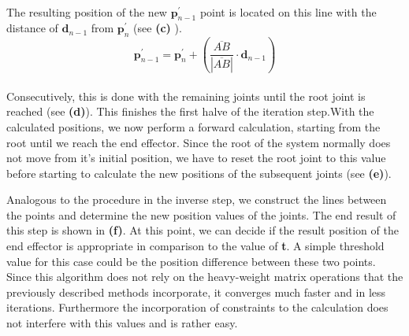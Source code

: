 \\The resulting position of the new $\textbf{p}_{n-1}^{'}$ point is located on this line with the distance of $\textbf{d}_{n-1}$ from $\textbf{p}_{n}^{'}$ (see \textbf{(c)} ).\\
\begin{equation}
\textbf{p}_{n-1}^{'}= \textbf{p}_{n}^{'}+ \left(\frac{\overline{AB}}{|\overline{AB}|}\cdot\textbf{d}_{n-1}\right)
\end{equation}
\\Consecutively, this is done with the remaining joints until the root joint is reached (see \textbf{(d)}).
This finishes the first halve of the iteration step.With the calculated positions, we now perform a forward calculation, starting from the root until we reach the end effector. Since the root of the system normally does not move from it's initial position, we have to reset the root joint to this value before starting to calculate the new positions of the subsequent joints (see\textbf{ (e)}).

Analogous to the procedure in the inverse step, we construct the lines between the points and determine the new position values of the joints. The end result of this step is shown in \textbf{(f)}. At this point, we can decide if the result position of the end effector is appropriate in comparison to the value of \textbf{t}. A simple threshold value for this case could be the position difference between these two points.
\\Since this algorithm does not rely on the heavy-weight matrix operations that the previously described methods incorporate, it converges much faster and in less iterations. Furthermore the incorporation of constraints to the calculation does not interfere with this values and is rather easy.